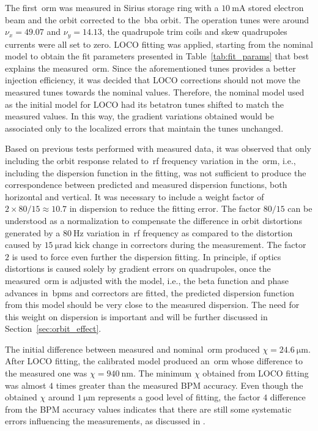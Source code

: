 The first~\gls{orm} was measured in Sirius storage ring with a $\SI{10}{\milli\ampere}$ stored electron beam and the orbit corrected to the~\gls{bba} orbit. The operation tunes were around $\nu_x = 49.07$ and $\nu_y = 14.13$, the quadrupole trim coils and skew quadrupoles currents were all set to zero. LOCO fitting was applied, starting from the nominal model to obtain the fit parameters presented in Table~\ref{tab:fit_params} that best explains the measured~\gls{orm}. Since the aforementioned tunes provides a better injection efficiency, it was decided that LOCO corrections should not move the measured tunes towards the nominal values. Therefore, the nominal model used as the initial model for LOCO had its betatron tunes shifted to match the measured values. In this way, the gradient variations obtained would be associated only to the localized errors that maintain the tunes unchanged.

Based on previous tests performed with measured data, it was observed that only including the orbit response related to~\gls{rf} frequency variation in the~\gls{orm}, i.e., including the dispersion function in the fitting, was not sufficient to produce the correspondence between predicted and measured dispersion functions, both horizontal and vertical. It was necessary to include a weight factor of $2 \times 80/15 \approx 10.7$ in dispersion to reduce the fitting error. The factor $80/15$ can be understood as a normalization to compensate the difference in orbit distortions generated by a $\SI{80}{\hertz}$ variation in~\gls{rf} frequency as compared to the distortion caused by $\SI{15}{\micro\radian}$ kick change in correctors during the measurement. The factor $2$ is used to force even further the dispersion fitting. In principle, if optics distortions is caused solely by gradient errors on quadrupoles, once the measured~\gls{orm} is adjusted with the model, i.e., the beta function and phase advances in~\glspl{bpm} and correctors are fitted, the predicted dispersion function from this model should be very close to the measured dispersion. The need for this weight on dispersion is important and will be further discussed in Section~\ref{sec:orbit_effect}.

The initial difference between measured and nominal~\gls{orm} produced $\chi = \SI{24.6}{\micro\meter}$. After LOCO fitting, the calibrated model produced an~\gls{orm} whose difference to the measured one was $\chi = \SI{940}{\nano\meter}$. The minimum $\chi$ obtained from LOCO fitting was almost $4$ times greater than the measured BPM accuracy. Even though the obtained $\chi$ around $\SI{1}{\micro\meter}$ represents a good level of fitting, the factor $4$ difference from the BPM accuracy values indicates that there are still some systematic errors influencing the measurements, as discussed in \cite{safranek1995}.

